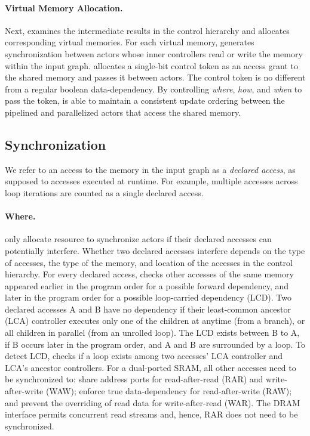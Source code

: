 \paragraph{Virtual Memory Allocation.}
Next, \name{} examines the intermediate results in the control hierarchy and allocates corresponding virtual memories.
For each virtual memory, \name{} generates synchronization between actors whose inner controllers read or write the memory within the input graph.
\name{} allocates a single-bit control token as an access grant to the shared memory and passes it between actors. 
The control token is no different from a regular boolean data-dependency.
By controlling {\em where}, {\em how}, and {\em when} to pass the token, \name{} is able to maintain a consistent update ordering between the pipelined and parallelized actors that access the shared memory.

\subsection{Synchronization} 
\label{sec:sync}
We refer to an access to the memory in the input graph as a \emph{declared access}, as supposed to accesses executed at runtime.
For example, multiple accesses across loop iterations are counted as a single declared access.

\paragraph{Where.}
\name only allocate resource to synchronize actors if their declared accesses can potentially interfere.
Whether two declared accesses interfere depends on the type of accesses, the type of the memory, and location of the accesses in the control hierarchy.
For every declared access, \name{} checks other accesses of the same memory appeared earlier in the program order for a possible forward dependency, and later in the program order for a possible loop-carried dependency (LCD). 
Two declared accesses A and B have no dependency if their least-common ancestor (LCA) controller executes only one of the children at anytime (from a branch), or all children in parallel (from an unrolled loop).
The LCD exists between B to A, if B occurs later in the program order, and A and B are surrounded by a loop.
To detect LCD, \name checks if a loop exists among two accesses' LCA controller and LCA's ancestor controllers.
For a dual-ported SRAM, all other accesses need to be synchronized to: share address ports for read-after-read (RAR) and write-after-write (WAW); 
enforce true data-dependency for read-after-write (RAW); and
prevent the overriding of read data for write-after-read (WAR).
The DRAM interface permits concurrent read streams and, hence, RAR does not need to be synchronized.

